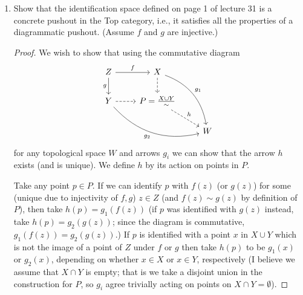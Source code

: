 \documentclass[11pt]{article}
\begin{document}
\begin{enumerate}
    \item Show that the identification space defined on page 1 of lecture 31 is a concrete pushout in the Top category, i.e., it satisfies all the properties of a diagrammatic pushout. (Assume $f$ and $g$ are injective.) \begin{proof}
        We wish to show that using the commutative diagram %
        \[\begin{tikzcd}
            Z & X \\
            Y & {P=\frac{X\cup Y}{\sim}} \\
            && W
            \arrow["f", from=1-1, to=1-2]
            \arrow["g"', from=1-1, to=2-1]
            \arrow[dashed, from=2-1, to=2-2]
            \arrow[dashed, from=1-2, to=2-2]
            \arrow["{g_2}"', bend right=30, from=2-1, to=3-3]
            \arrow["{g_1}", bend left=30, from=1-2, to=3-3]
            \arrow["h", dashed, from=2-2, to=3-3]
        \end{tikzcd}\] for any topological space $W$ and arrows $g_i$ we can show that the arrow $h$ exists (and is unique). We define $h$ by its action on points in $P$. 
        
        Take any point $p\in P$. If we can identify $p$ with $f(z)$ (or $g(z)$) for some (unique due to injectivity of $f,g$) $z\in Z$ (and $f(z)\sim g(z)$ by definition of $P$), then take $h(p) = g_1(f(z))$ (if $p$ was identified with $g(z)$ instead, take $h(p) = g_2(g(z))$; since the diagram is commutative, $g_1(f(z)) = g_2(g(z))$.) If $p$ is identified with a point $x$ in $X\cup Y$ which is not the image of a point of $Z$ under $f$ or $g$ then take $h(p)$ to be $g_1(x)$ or $g_2(x)$, depending on whether $x\in X$ or $x\in Y$, respectively (I believe we assume that $X\cap Y$ is empty; that is we take a disjoint union in the construction for $P$, so $g_i$ agree trivially acting on points on $X\cap Y = \emptyset$).


\end{proof}
\end{enumerate}
\end{document}
